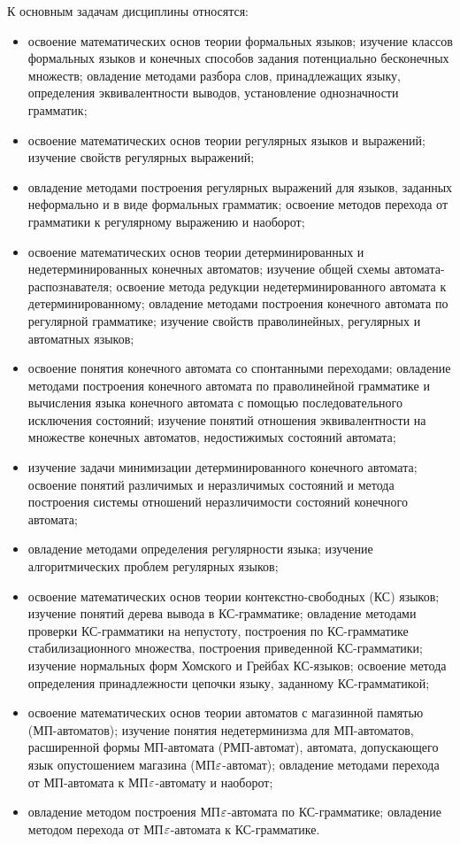 К основным задачам дисциплины относятся: 
\begin{itemize}
\item освоение математических основ теории формальных языков; изучение классов формальных языков и конечных способов задания потенциально бесконечных множеств; овладение методами разбора слов, принадлежащих языку, определения эквивалентности выводов, установление однозначности грамматик;
\item освоение математических основ теории регулярных языков и выражений; изучение свойств регулярных выражений; 
\item овладение методами построения регулярных выражений для языков, заданных неформально и в виде формальных грамматик; освоение методов перехода от грамматики к регулярному выражению и наоборот;
\item освоение математических основ теории детерминированных и недетерминированных конечных автоматов; изучение общей схемы автомата-распознавателя; освоение метода редукции недетерминированного автомата к детерминированному; овладение методами построения конечного автомата по регулярной грамматике; изучение свойств праволинейных, регулярных и автоматных языков;
\item освоение понятия конечного автомата со спонтанными переходами; овладение методами построения конечного автомата по праволинейной грамматике и вычисления языка конечного автомата с помощью последовательного исключения состояний; изучение понятий отношения эквивалентности на множестве конечных автоматов, недостижимых состояний автомата;
\item изучение задачи минимизации детерминированного конечного автомата; освоение понятий различимых и неразличимых состояний и метода построения системы отношений неразличимости состояний конечного автомата; 
\item овладение методами определения регулярности языка; изучение алгоритмических проблем регулярных языков;
\item освоение математических основ теории контекстно-свободных (КС) языков; изучение понятий дерева вывода в КС-грамматике; овладение методами проверки КС-грамматики на непустоту, построения по КС-грамматике стабилизационного множества, построения приведенной КС-грамматики; изучение нормальных форм Хомского и Грейбах КС-языков; освоение метода определения принадлежности цепочки языку, заданному КС-грамматикой;
\item освоение математических основ теории автоматов с магазинной памятью (МП-автоматов); изучение понятия недетерминизма для МП-автоматов, расширенной формы МП-автомата (РМП-автомат), автомата, допускающего язык опустошением магазина (МП$\varepsilon$-автомат); овладение методами перехода от МП-автомата к МП$\varepsilon$-автомату и наоборот; 
\item овладение методом построения МП$\varepsilon$-автомата по КС-грамматике; овладение методом перехода от МП$\varepsilon$-автомата к КС-грамматике. 
\end{itemize}


